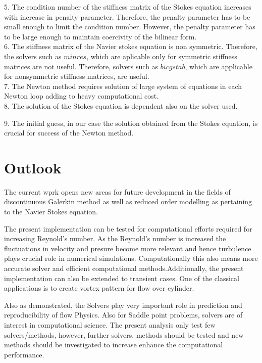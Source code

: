 \documentclass[a4paper]{book}
\begin{document}
5. The condition number of the stiffness matrix of the Stokes equation increases with increase in penalty parameter. Therefore, the penalty parameter has to be small enough to limit the condition number. However, the penalty parameter has to be large enough to maintain coercivity of the bilinear form. \\

6. The stiffness matrix of the Navier stokes equation is non symmetric. Therefore, the solvers such as $minres$, which are aplicable only for symmetric stiffness matrices are not useful. Therefore, solvers such as $bicgstab$, which are applicable for nonsymmetric stiffness matrices, are useful.\\

7. The Newton method requires solution of large system of equations in each Newton loop adding to heavy computational cost.\\

8. The solution of the Stokes equation is dependent also on the solver used.

9. The initial guess, in our case the solution obtained from the Stokes equation, is crucial for success of the Newton method.\\

\section{Outlook}

The current wprk opens new areas for future development in the fields of discontinuous Galerkin method as well as reduced order modelling as pertaining to the Navier Stokes equation. 

The present implementation can be tested for computational efforts  required for increasing Reynold's number. As the Reynold's number is increased the fluctuations in velocity and presure become more relevant and hence turbulence plays crucial role in numerical simulations. Computationally this also means more accurate solver and efficient computational methods.Additionally, the present implementation can also be extended to transient cases. One of the classical applications is to create vortex pattern for flow over cylinder.

Also as demonstrated, the Solvers play very important role in prediction and reproducibility of flow Physics. Also for Saddle point problems, solvers are of interest in computational science. The present analysis only test few solvers/methods, however, further solvers, methods should be tested and new methods should be investigated to increase enhance the computational performance.
\end{document}
